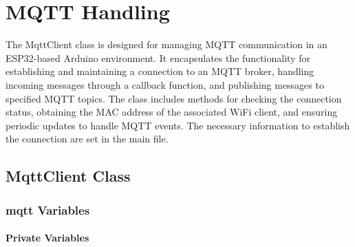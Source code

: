 \chapter{MQTT Handling}
\label{chap:MQTT_Handling}

The MqttClient class is designed for managing MQTT communication in an ESP32-based Arduino environment. 
It encapsulates the functionality for establishing and maintaining a connection to an MQTT broker, handling incoming messages through a callback function, and publishing messages to specified MQTT topics. 
The class includes methods for checking the connection status, obtaining the MAC address of the associated WiFi client, and ensuring periodic updates to handle MQTT events.
The necessary information to establish the connection are set in the main file. 

\section{MqttClient Class}
\label{sec:MqttClient_Class}


\subsection{mqtt Variables}
\label{sub:mqtt_Variables}

\subsubsection{Private Variables}

